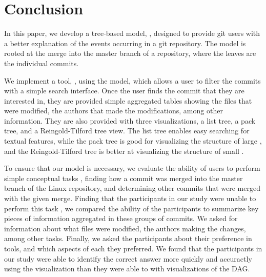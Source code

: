 \section{Conclusion}
\label{sec:conclusion}


In this paper, we develop a tree-based model, \mt, designed to provide git
users with a better explanation of the events occurring in a git
repository. The \mt model is rooted at the merge into the master branch
of a repository, where the leaves are the individual commits.

We implement a tool, \tool, using the \mt model, which allows a user to
filter the commits with a simple search interface. Once the user finds 
the commit that they are interested in, they are provided simple
aggregated tables showing the files that were modified, the authors that
made the modifications, among other information. 
They are also provided
with three visualizations, a list tree, a pack tree, and a
Reingold-Tilford tree view. The list tree enables easy searching for
textual features, while the pack tree is good for visualizing the
structure of large , and the Reingold-Tilford tree is better
at visualizing the structure of small .

To ensure that our model is necessary, we evaluate the ability of users
to perform simple conceptual tasks 
, finding how a commit was merged into
the master branch of the Linux repository, and determining other commits
that were merged with the given merge. Finding that the participants in
our study were unable to perform this task , we compared the ability of
the participants to summarize key pieces of information aggregated in
these groups of commits. We asked for information about what files were
modified, the authors making the changes, among other tasks. Finally, we
asked the participants about their preference in tools, and which
aspects of each they preferred. We found that the participants in our
study were able to identify the correct answer more quickly and
accuractly using the \mt visualization than they were able to with
visualizations of the DAG.

